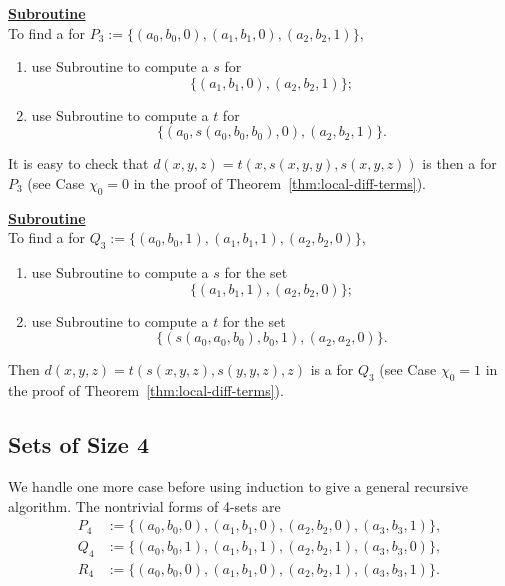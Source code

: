 \noindent \underline{\textbf{Subroutine }}\\[4pt]
To find a \ldto for
$P_3:=\{(a_0, b_0, 0), (a_1, b_1, 0),  (a_2, b_2, 1)\}$,
\begin{enumerate}
\item use Subroutine  to compute a \ldto $s$ for
\begin{equation*}
\{(a_1, b_1, 0), (a_2, b_2, 1)\};
\end{equation*}
\item use Subroutine  to compute a \ldto $t$ for
\begin{equation*}
\{(a_0, s(a_0, b_0, b_0), 0), (a_2, b_2, 1)\}.
\end{equation*}
\end{enumerate}
It is easy to check that
$d(x,y,z) = t(x, s(x,y,y), s(x,y,z))$
is then a \ldto for $P_3$
(see Case $\chi_0=0$ in the proof of Theorem~\ref{thm:local-diff-terms}).


\noindent \underline{\textbf{Subroutine }}\\[4pt]
To find a \ldto for
$Q_3 := \{(a_0, b_0, 1), (a_1, b_1, 1), (a_2, b_2, 0)\}$,
\begin{enumerate}
\item \label{item:001-1}
use Subroutine  to compute a \ldto $s$ for the set
\begin{equation*}
\{(a_1, b_1, 1), (a_2, b_2, 0)\};
\end{equation*}
\item \label{item:001-2} use Subroutine  to compute a \ldto $t$
for the set
\begin{equation*}
\{(s(a_0, a_0, b_0), b_0, 1),  (a_2,a_2,0)\}.
\end{equation*}
\end{enumerate}
Then
$d(x,y,z) = t(s(x,y,z), s(y,y,z),z)$
is a \ldto  for $Q_3$ (see Case $\chi_0=1$ in the proof of Theorem~\ref{thm:local-diff-terms}).

\subsection{Sets of Size 4} We handle one more case before
using induction to give a general recursive algorithm.
The nontrivial forms of 4-sets are
\begin{align*}
P_4 &:= \{(a_0, b_0, 0), (a_1, b_1, 0),  (a_2, b_2, 0),  (a_3, b_3, 1)\},\\
Q_4 &:= \{(a_0, b_0, 1), (a_1, b_1, 1), (a_2, b_2, 1), (a_3, b_3, 0)\},\\
R_4 &:= \{(a_0, b_0, 0), (a_1, b_1, 0),  (a_2, b_2, 1),  (a_3, b_3, 1)\}.
\end{align*}

